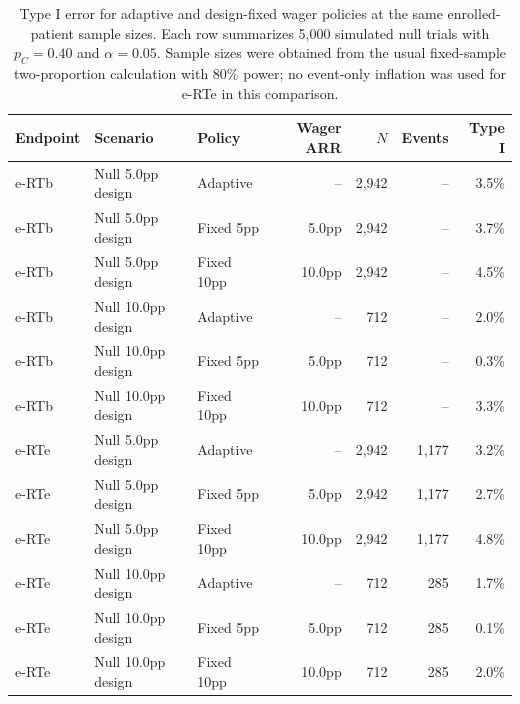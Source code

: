 \begin{table}[htbp]
\centering
\caption{Type I error for adaptive and design-fixed wager policies at the same enrolled-patient sample sizes. Each row summarizes 5{,}000 simulated null trials with $p_C = 0.40$ and $\alpha = 0.05$. Sample sizes were obtained from the usual fixed-sample two-proportion calculation with 80\% power; no event-only inflation was used for e-RTe in this comparison.}
\label{tab:wager_policy_type1}
\begin{tabular}{@{}lllrrrr@{}}
\toprule
Endpoint & Scenario & Policy & Wager ARR & $N$ & Events & Type I \\
\midrule
e-RTb & Null 5.0pp design & Adaptive & -- & 2{,}942 & -- & 3.5\% \\
e-RTb & Null 5.0pp design & Fixed 5pp & 5.0pp & 2{,}942 & -- & 3.7\% \\
e-RTb & Null 5.0pp design & Fixed 10pp & 10.0pp & 2{,}942 & -- & 4.5\% \\
e-RTb & Null 10.0pp design & Adaptive & -- & 712 & -- & 2.0\% \\
e-RTb & Null 10.0pp design & Fixed 5pp & 5.0pp & 712 & -- & 0.3\% \\
e-RTb & Null 10.0pp design & Fixed 10pp & 10.0pp & 712 & -- & 3.3\% \\
e-RTe & Null 5.0pp design & Adaptive & -- & 2{,}942 & 1{,}177 & 3.2\% \\
e-RTe & Null 5.0pp design & Fixed 5pp & 5.0pp & 2{,}942 & 1{,}177 & 2.7\% \\
e-RTe & Null 5.0pp design & Fixed 10pp & 10.0pp & 2{,}942 & 1{,}177 & 4.8\% \\
e-RTe & Null 10.0pp design & Adaptive & -- & 712 & 285 & 1.7\% \\
e-RTe & Null 10.0pp design & Fixed 5pp & 5.0pp & 712 & 285 & 0.1\% \\
e-RTe & Null 10.0pp design & Fixed 10pp & 10.0pp & 712 & 285 & 2.0\% \\
\bottomrule
\end{tabular}
\end{table}

